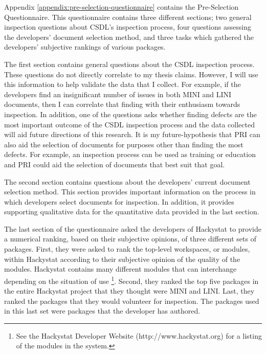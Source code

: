 Appendix \ref{appendix:pre-selection-questionnaire} contains the
Pre-Selection Questionnaire. This questionnaire contains three different
sections; two general inspection questions about CSDL's inspection process,
four questions assessing the developers' document selection method, and
three tasks which gathered the developers' subjective rankings of various
packages.

The first section contains general questions about the CSDL inspection
process. These questions do not directly correlate to my thesis claims.
However, I will use this information to help validate the data that I
collect. For example, if the developers find an insignificant number of
issues in both MINI and LINI documents, then I can correlate that finding
with their enthusiasm towards inspection. In addition, one of the questions
asks whether finding defects are the most important outcome of the CSDL
inspection process and the data collected will aid future directions of
this research. It is my future-hypothesis that PRI can also aid the
selection of documents for purposes other than finding the most defects.
For example, an inspection process can be used as training or education and
PRI could aid the selection of documents that best suit that goal.

The second section contains questions about the developers' current
document selection method. This section provides important information on
the process in which developers select documents for inspection. In
addition, it provides supporting qualitative data for the quantitative data
provided in the last section.

The last section of the questionnaire asked the developers of Hackystat to
provide a numerical ranking, based on their subjective opinions, of three
different sets of packages. First, they were asked to rank the top-level
workspaces, or modules, within Hackystat according to their subjective
opinion of the quality of the modules. Hackystat contains many different
modules that can interchange depending on the situation of use
\footnote{See the Hackystat Developer Website (http://www.hackystat.org)
  for a listing of the modules in the system.}. Second, they ranked the top
five packages in the entire Hackystat project that they thought were MINI
and LINI. Last, they ranked the packages that they would volunteer for
inspection. The packages used in this last set were packages that the
developer has authored.

